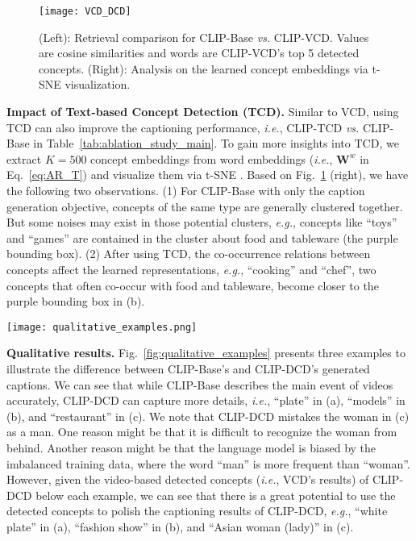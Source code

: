 \documentclass[runningheads]{llncs}
\newcommand\vs{\textit{vs.}}
\newcommand\eg{\textit{e.g.}}
\newcommand\ie{\textit{i.e.}}
\begin{document}
\begin{figure}[t]
    \centering
    \texttt{[image: VCD\_DCD]}
    \caption{(Left): Retrieval comparison for CLIP-Base \vs{} CLIP-VCD. Values are cosine similarities and words are CLIP-VCD's top 5 detected concepts. (Right): Analysis on the learned concept embeddings via t-SNE visualization.}
    \label{fig:VCD_DCD}
\end{figure}

\noindent\textbf{Impact of Text-based Concept Detection (TCD).} 
Similar to VCD, using TCD can also improve the captioning performance, \ie{}, CLIP-TCD \vs{} CLIP-Base in Table~\ref{tab:ablation_study_main}. To gain more insights into TCD, we extract $K=500$ concept embeddings from word embeddings (\ie{}, $\mathbf{W}^{w}$ in Eq.~\ref{eq:AR_T}) and visualize them via t-SNE \cite{van2008visualizing}. Based on Fig.~\ref{fig:VCD_DCD} (right), we have the following two observations. 
(1) For CLIP-Base with only the caption generation objective, concepts of the same type are generally clustered together. But some noises may exist in those potential clusters, \eg{}, concepts like ``toys'' and ``games'' are contained in the cluster about food and tableware (the purple bounding box). 
(2) After using TCD, the co-occurrence relations between concepts affect the learned representations, \eg{}, ``cooking'' and ``chef'', two concepts that often co-occur with food and tableware, become closer to the purple bounding box in (b).



\begin{figure*}[t]
\centering
\texttt{[image: qualitative\_examples.png]}
\caption{Captioning results of the CLIP-Base (M1) and CLIP-DCD (M2) models, where we emphasize \textcolor{darkgreen}{\textbf{accurate keywords}} and \textcolor{red}{\textbf{\underline{errors}}}. Among M2's video-based detected concepts, we highlight \textcolor{orange}{\textbf{\textit{meaningful concepts}}} yet to be utilized.
} 
\label{fig:qualitative_examples}
\end{figure*}

\noindent\textbf{Qualitative results.} Fig.~\ref{fig:qualitative_examples} presents three examples to illustrate the difference between CLIP-Base's and CLIP-DCD's generated captions. We can see that while CLIP-Base describes the main event of videos accurately, CLIP-DCD can capture more details, \ie{}, ``plate'' in (a), ``models'' in (b), and ``restaurant'' in (c). We note that CLIP-DCD mistakes the woman in (c) as a man. One reason might be that it is difficult to recognize the woman from behind. Another reason might be that the language model is biased by the imbalanced training data, where the word ``man'' is more frequent than ``woman''. However, given the video-based detected concepts (\ie{}, VCD's results) of CLIP-DCD below each example, we can see that there is a great potential to use the detected concepts to polish the captioning results of CLIP-DCD, \eg{}, ``white plate'' in (a), ``fashion show'' in (b), and ``Asian woman (lady)'' in (c). 
\end{document}
